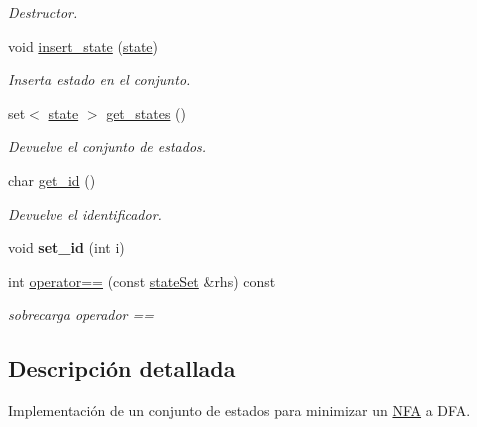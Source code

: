 \begin{DoxyCompactItemize}
\begin{DoxyCompactList}\small\item\em Destructor. \end{DoxyCompactList}\item 
\mbox{\label{classstate_set_aa3906c273d091355ea57979ef5607c6d}} 
void \mbox{\hyperlink{classstate_set_aa3906c273d091355ea57979ef5607c6d}{insert\+\_\+state}} (\mbox{\hyperlink{classstate}{state}})
\begin{DoxyCompactList}\small\item\em Inserta estado en el conjunto. \end{DoxyCompactList}\item 
\mbox{\label{classstate_set_a5c26b67db12e8613dcaef6b0c07f0687}} 
set$<$ \mbox{\hyperlink{classstate}{state}} $>$ \mbox{\hyperlink{classstate_set_a5c26b67db12e8613dcaef6b0c07f0687}{get\+\_\+states}} ()
\begin{DoxyCompactList}\small\item\em Devuelve el conjunto de estados. \end{DoxyCompactList}\item 
\mbox{\label{classstate_set_adaf364790e1910d6883eceb7729ca0e9}} 
char \mbox{\hyperlink{classstate_set_adaf364790e1910d6883eceb7729ca0e9}{get\+\_\+id}} ()
\begin{DoxyCompactList}\small\item\em Devuelve el identificador. \end{DoxyCompactList}\item 
\mbox{\label{classstate_set_a2708605cd599a15bd9ca5ddba68832d0}} 
void {\bfseries set\+\_\+id} (int i)
\item 
\mbox{\label{classstate_set_a4afb07dd96d47db65515e9d8abf38eda}} 
int \mbox{\hyperlink{classstate_set_a4afb07dd96d47db65515e9d8abf38eda}{operator==}} (const \mbox{\hyperlink{classstate_set}{state\+Set}} \&rhs) const
\begin{DoxyCompactList}\small\item\em sobrecarga operador == \end{DoxyCompactList}\end{DoxyCompactItemize}


\subsection{Descripción detallada}
Implementación de un conjunto de estados para minimizar un \mbox{\hyperlink{class_n_f_a}{N\+FA}} a D\+FA. 

